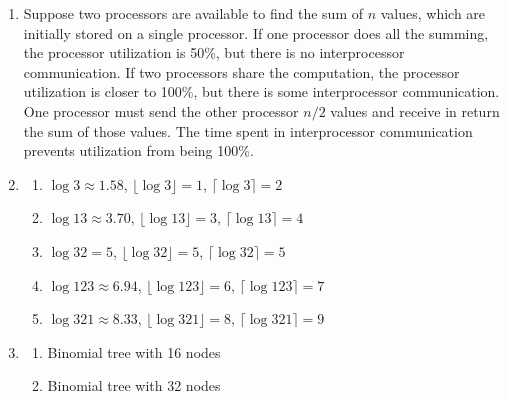 \begin{enumerate}
\item Suppose two processors are available to find the sum of $n$ values,
      which are initially stored on a single processor.
      If one processor does all the summing, the processor utilization is
      50\%, but there is no interprocessor communication.
      If two processors share the computation, the processor utilization is
      closer to 100\%, but there is some interprocessor communication.
      One processor must send the other processor $n/2$ values and receive
      in return the sum of those values.
      The time spent in interprocessor communication prevents utilization
      from being 100\%.

\item \begin{enumerate}
      \item $\log 3 \approx 1.58$, $\lfloor\log 3\rfloor = 1$,
            $\lceil\log 3\rceil = 2$
      \item $\log 13 \approx 3.70$, $\lfloor\log 13\rfloor = 3$,
            $\lceil\log 13\rceil = 4$
      \item $\log 32 = 5$, $\lfloor\log 32\rfloor = 5$,
            $\lceil\log 32\rceil = 5$
      \item $\log 123 \approx 6.94$, $\lfloor\log 123\rfloor = 6$,
            $\lceil\log 123\rceil = 7$
      \item $\log 321 \approx 8.33$, $\lfloor\log 321\rfloor = 8$,
            $\lceil\log 321\rceil = 9$
      \end{enumerate}

\item \begin{enumerate}

      \item Binomial tree with 16 nodes

      \begin{center}
      \end{center}

      \item Binomial tree with 32 nodes

      \begin{center}
      \end{center}

      \end{enumerate}


\end{enumerate}
